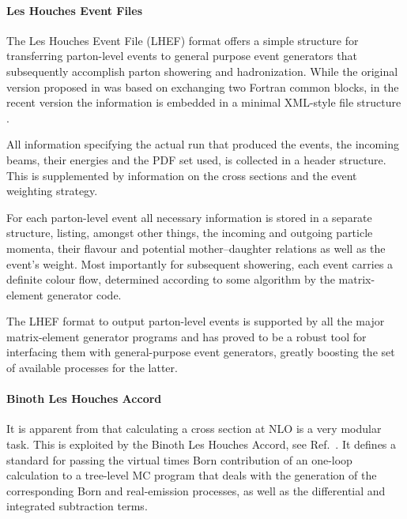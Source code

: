 \label{sec:MEinterfaces}
\paragraph{Les Houches Event Files}
The Les Houches Event File (LHEF) format offers a simple structure for 
transferring parton-level events to general purpose event generators that
subsequently accomplish parton showering and hadronization. While the 
original version proposed in \cite{Boos:2001cv} was based on exchanging two
Fortran common blocks, in the recent version the information is 
embedded in a minimal XML-style file structure \cite{Alwall:2006yp}. 

All information specifying the actual run that 
produced the events, \eg the incoming beams, their 
energies and the PDF set used, is collected in a header structure.
This is supplemented by information on the 
cross sections and the event weighting strategy.

For each parton-level event all necessary information is stored in a 
separate structure, listing, amongst other things, the incoming and 
outgoing particle momenta, their flavour and potential mother--daughter 
relations as well as the event's weight. Most importantly for subsequent 
showering, each event carries a definite colour flow, 
determined according to some algorithm by the matrix-element generator 
code.

The LHEF format to output parton-level events is supported by all the 
major matrix-element generator programs and has proved to be a robust tool
for interfacing them with general-purpose event generators,
greatly boosting the set of available processes for the latter. 

\paragraph{Binoth Les Houches Accord} 
It is apparent from 
that calculating a cross section at NLO is a very modular 
task. This is exploited by the Binoth Les Houches Accord, see 
Ref.~\cite{Binoth:2010xt}. It defines
a standard for passing the virtual times Born contribution of an one-loop 
calculation to a tree-level MC program that deals with the 
generation of the corresponding Born and real-emission processes, as 
well as the differential and integrated subtraction terms. 

